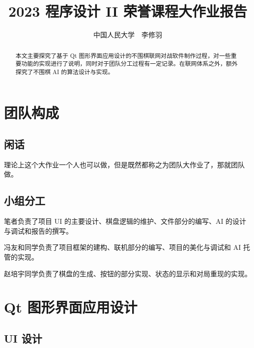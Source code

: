 \documentclass{noithesis}
\begin{document}
	
	\title{2023 程序设计 II 荣誉课程大作业报告}
	\author{中国人民大学~~李修羽}
	
	\maketitle
	
	\begin{abstract}
		本文主要探究了基于 Qt 图形界面应用设计的不围棋联网对战软件制作过程，对一些重要功能的实现进行了说明，同时对于团队分工过程有一定记录。在联网体系之外，额外探究了不围棋 AI 的算法设计与实现。
	\end{abstract}

	\tableofcontents
	\setcounter{page}{0}
	\thispagestyle{empty}
	\newpage
	
	\section{团队构成}
	
	\subsection{闲话}
	
	理论上这个大作业一个人也可以做，但是既然都称之为团队大作业了，那就团队做。
	
	\subsection{小组分工}
	
	笔者负责了项目 UI 的主要设计、棋盘逻辑的维护、文件部分的编写、AI 的设计与调试和报告的撰写。
	
	冯友和同学负责了项目框架的建构、联机部分的编写、项目的美化与调试和 AI 托管的实现。
	
	赵培宇同学负责了棋盘的生成、按钮的部分实现、状态的显示和对局重现的实现。
	
	\section{Qt 图形界面应用设计}
	
	\subsection{UI 设计}
	
\end{document}
